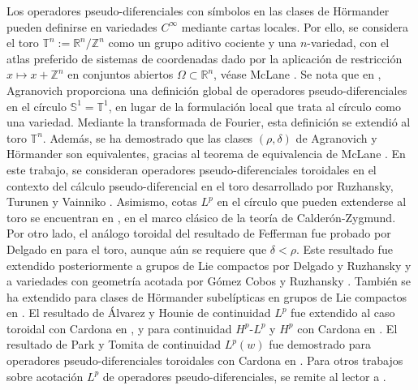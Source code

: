 Los operadores pseudo-diferenciales con símbolos en las clases de Hörmander pueden definirse en variedades $C^\infty$ mediante cartas locales. Por ello, se considera el toro $\mathbb{T}^n:=\mathbb{R}^n/\mathbb{Z}^n$ como un grupo aditivo cociente y una $n$-variedad, con el atlas preferido de sistemas de coordenadas dado por la aplicación de restricción $x\mapsto x + \mathbb{Z}^n$ en conjuntos abiertos $\Omega \subset \mathbb{R}^n$, véase McLane \cite{mclane}. Se nota que en \cite{agranovich}, Agranovich proporciona una definición global de operadores pseudo-diferenciales en el círculo $\mathbb{S}^1=\mathbb{T}^1$, en lugar de la formulación local que trata al círculo como una variedad. Mediante la transformada de Fourier, esta definición se extendió al toro $\mathbb{T}^n$. Además, se ha demostrado que las clases $(\rho,\delta)$ de Agranovich y Hörmander son equivalentes, gracias al teorema de equivalencia de McLane \cite{mclane}. En este trabajo, se consideran operadores pseudo-diferenciales toroidales en el contexto del cálculo pseudo-diferencial en el toro desarrollado por Ruzhansky, Turunen y Vainniko \cite{ruzhansky-turunen2, ruzhansky-turunen}. Asimismo, cotas $L^p$ en el círculo que pueden extenderse al toro se encuentran en \cite{wong}, en el marco clásico de la teoría de Calderón-Zygmund. Por otro lado, el análogo toroidal del resultado de Fefferman fue probado por Delgado en \cite{delgado} para el toro, aunque aún se requiere que $\delta<\rho$. Este resultado fue extendido posteriormente a grupos de Lie compactos por Delgado y Ruzhansky \cite{delgado-ruzhansky} y a variedades con geometría acotada por Gómez Cobos y Ruzhansky \cite{cobos-ruzhansky}. También se ha extendido para clases de Hörmander subelípticas en grupos de Lie compactos en \cite{cardona-ruzhansky-subelliptic}. El resultado  de Álvarez y Hounie de continuidad $L^p$ fue extendido al caso toroidal con Cardona en \cite{Cardona:Martinez}, y para continuidad $H^p$-$L^p$ y $H^p$ con Cardona en \cite{cardona-martinez-II}. El resultado de Park y Tomita de continuidad $L^p(w)$ fue demostrado para operadores pseudo-diferenciales toroidales con Cardona en \cite{cardona-martinez-III}. Para otros trabajos sobre acotación $L^p$ de operadores pseudo-diferenciales, se remite al lector a \cite{cardona, molahajloo-wong, ruzhansky-turunen-quant}.
